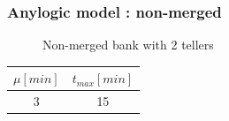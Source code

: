 \documentclass[10pt]{beamer}
\begin{document}
\begin{frame}
  \frametitle{Anylogic model : non-merged}
  \begin{figure}
  \centering
{}

\caption{Non-merged bank with 2 tellers}
  \end{figure}
  
\begin{table}
\centering
\begin{tabular}{|c|c|}
\hline
$\mu [min]$ & $t_{max} [min]$ \\
\hline
3 & 15 \\
\hline
\end{tabular} 
\end{table}

\end{frame}
\end{document}
